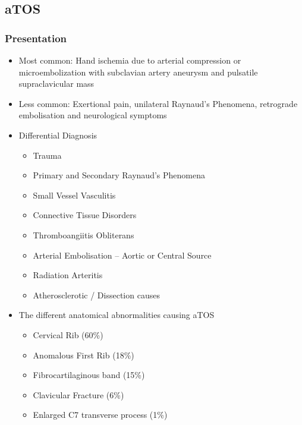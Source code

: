 \documentclass[
]{book}
\begin{document}
\hypertarget{atos}{%
\subsection{aTOS}\label{atos}}

\hypertarget{presentation-7}{%
\subsubsection{Presentation}\label{presentation-7}}

\begin{itemize}
\item
  Most common: Hand ischemia due to arterial compression or
  microembolization with subclavian artery aneurysm and pulsatile
  supraclavicular mass \citep{boll122ThoracicOutlet2019}
\item
  Less common: Exertional pain, unilateral Raynaud's Phenomena,
  retrograde embolisation and neurological symptoms
\item
  Differential Diagnosis

  \begin{itemize}
  \item
    Trauma
  \item
    Primary and Secondary Raynaud's Phenomena
  \item
    Small Vessel Vasculitis
  \item
    Connective Tissue Disorders
  \item
    Thromboangiitis Obliterans
  \item
    Arterial Embolisation -- Aortic or Central Source
  \item
    Radiation Arteritis
  \item
    Atherosclerotic / Dissection causes
  \end{itemize}
\item
  The different anatomical abnormalities causing aTOS
  \citep{boll122ThoracicOutlet2019}

  \begin{itemize}
  \item
    Cervical Rib (60\%)
  \item
    Anomalous First Rib (18\%)
  \item
    Fibrocartilaginous band (15\%)
  \item
    Clavicular Fracture (6\%)
  \item
    Enlarged C7 transverse process (1\%)
  \end{itemize}
\end{itemize}
\end{document}
